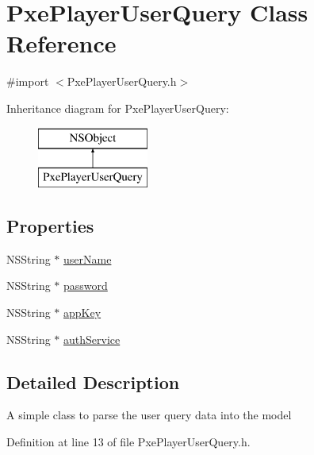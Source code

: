 \hypertarget{interface_pxe_player_user_query}{\section{Pxe\-Player\-User\-Query Class Reference}
\label{interface_pxe_player_user_query}
}


{\ttfamily \#import $<$Pxe\-Player\-User\-Query.\-h$>$}

Inheritance diagram for Pxe\-Player\-User\-Query\-:\begin{figure}[H]
\begin{center}
\leavevmode
\includegraphics[height=2.000000cm]{interface_pxe_player_user_query}
\end{center}
\end{figure}
\subsection*{Properties}
\begin{DoxyCompactItemize}
\item 
N\-S\-String $\ast$ \hyperlink{interface_pxe_player_user_query_aeb08b5a0387096996db8cdd1195480ea}{user\-Name}
\item 
N\-S\-String $\ast$ \hyperlink{interface_pxe_player_user_query_a604f4e6bdef2df7f04dee81ad1e969d3}{password}
\item 
N\-S\-String $\ast$ \hyperlink{interface_pxe_player_user_query_a17fa74296f432b038ab0836dd88522dd}{app\-Key}
\item 
N\-S\-String $\ast$ \hyperlink{interface_pxe_player_user_query_ad2148702ba3de2059955adfa2aca351f}{auth\-Service}
\end{DoxyCompactItemize}


\subsection{Detailed Description}
A simple class to parse the user query data into the model 

Definition at line 13 of file Pxe\-Player\-User\-Query.\-h.



